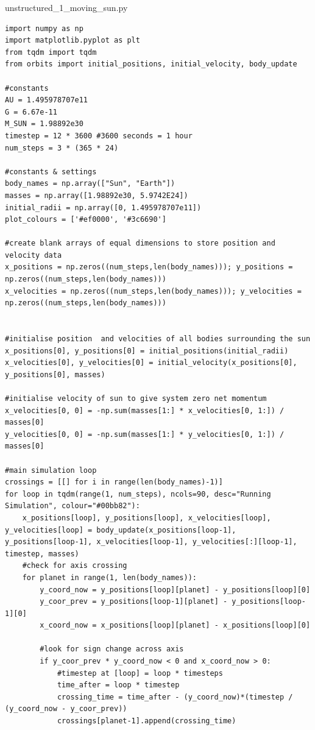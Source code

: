 \documentclass[11pt, a4paper, onecolumn]{article}
\begin{document}
unstructured\_1\_moving\_sun.py
\begin{lstlisting}
import numpy as np
import matplotlib.pyplot as plt
from tqdm import tqdm
from orbits import initial_positions, initial_velocity, body_update

#constants
AU = 1.495978707e11
G = 6.67e-11
M_SUN = 1.98892e30
timestep = 12 * 3600 #3600 seconds = 1 hour
num_steps = 3 * (365 * 24) 

#constants & settings
body_names = np.array(["Sun", "Earth"])
masses = np.array([1.98892e30, 5.9742E24])
initial_radii = np.array([0, 1.495978707e11])
plot_colours = ['#ef0000', '#3c6690']

#create blank arrays of equal dimensions to store position and velocity data
x_positions = np.zeros((num_steps,len(body_names))); y_positions = np.zeros((num_steps,len(body_names)))
x_velocities = np.zeros((num_steps,len(body_names))); y_velocities = np.zeros((num_steps,len(body_names)))


#initialise position  and velocities of all bodies surrounding the sun
x_positions[0], y_positions[0] = initial_positions(initial_radii)
x_velocities[0], y_velocities[0] = initial_velocity(x_positions[0], y_positions[0], masses)

#initialise velocity of sun to give system zero net momentum
x_velocities[0, 0] = -np.sum(masses[1:] * x_velocities[0, 1:]) / masses[0]
y_velocities[0, 0] = -np.sum(masses[1:] * y_velocities[0, 1:]) / masses[0]

#main simulation loop
crossings = [[] for i in range(len(body_names)-1)]
for loop in tqdm(range(1, num_steps), ncols=90, desc="Running Simulation", colour="#00bb82"):
    x_positions[loop], y_positions[loop], x_velocities[loop], y_velocities[loop] = body_update(x_positions[loop-1], y_positions[loop-1], x_velocities[loop-1], y_velocities[:][loop-1], timestep, masses)
    #check for axis crossing
    for planet in range(1, len(body_names)):
        y_coord_now = y_positions[loop][planet] - y_positions[loop][0]
        y_coor_prev = y_positions[loop-1][planet] - y_positions[loop-1][0]
        x_coord_now = x_positions[loop][planet] - x_positions[loop][0]

        #look for sign change across axis 
        if y_coor_prev * y_coord_now < 0 and x_coord_now > 0:
            #timestep at [loop] = loop * timesteps
            time_after = loop * timestep
            crossing_time = time_after - (y_coord_now)*(timestep / (y_coord_now - y_coor_prev))
            crossings[planet-1].append(crossing_time)



\end{lstlisting}
\end{document}
